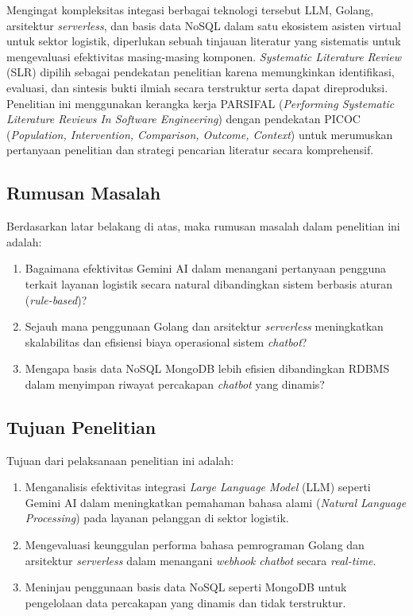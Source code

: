 Mengingat kompleksitas integasi berbagai teknologi tersebut LLM, Golang, arsitektur \textit{serverless}, dan basis data NoSQL dalam satu ekosistem asisten virtual untuk sektor logistik, diperlukan sebuah tinjauan literatur yang sistematis untuk mengevaluasi efektivitas masing-masing komponen. \textit{Systematic Literature Review} (SLR) dipilih sebagai pendekatan penelitian karena memungkinkan identifikasi, evaluasi, dan sintesis bukti ilmiah secara terstruktur serta dapat direproduksi. Penelitian ini menggunakan kerangka kerja PARSIFAL (\textit{Performing Systematic Literature Reviews In Software Engineering}) dengan pendekatan PICOC (\textit{Population, Intervention, Comparison, Outcome, Context}) untuk merumuskan pertanyaan penelitian dan strategi pencarian literatur secara komprehensif.

\subsection{Rumusan Masalah}

Berdasarkan latar belakang di atas, maka rumusan masalah dalam penelitian ini adalah:

\begin{enumerate}[leftmargin=*]
    \item Bagaimana efektivitas Gemini AI dalam menangani pertanyaan pengguna terkait layanan logistik secara natural dibandingkan sistem berbasis aturan (\textit{rule-based})?
    \item Sejauh mana penggunaan Golang dan arsitektur \textit{serverless} meningkatkan skalabilitas dan efisiensi biaya operasional sistem \textit{chatbot}?
    \item Mengapa basis data NoSQL MongoDB lebih efisien dibandingkan RDBMS dalam menyimpan riwayat percakapan \textit{chatbot} yang dinamis?
\end{enumerate}

\subsection{Tujuan Penelitian}

Tujuan dari pelaksanaan penelitian ini adalah:

\begin{enumerate}[leftmargin=*]
    \item Menganalisis efektivitas integrasi \textit{Large Language Model} (LLM) seperti Gemini AI dalam meningkatkan pemahaman bahasa alami (\textit{Natural Language Processing}) pada layanan pelanggan di sektor logistik.
    \item Mengevaluasi keunggulan performa bahasa pemrograman Golang dan arsitektur \textit{serverless} dalam menangani \textit{webhook chatbot} secara \textit{real-time}.
    \item Meninjau penggunaan basis data NoSQL seperti MongoDB untuk pengelolaan data percakapan yang dinamis dan tidak terstruktur.
\end{enumerate}

